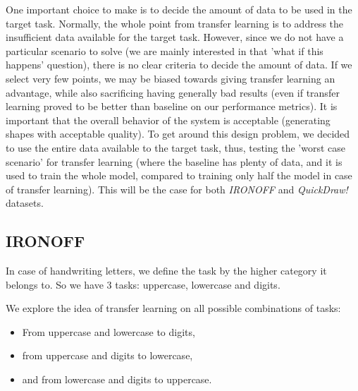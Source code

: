   \par One important choice to make is to decide the amount of data to be used in the target task. Normally, the whole point from transfer learning is to address the insufficient data available for the target task. However, since we do not have a particular scenario to solve (we are mainly interested in that 'what if this happens' question), there is no clear criteria to decide the amount of data. If we select very few points, we may be biased towards giving transfer learning an advantage, while also sacrificing having generally bad results (even if transfer learning proved to be better than baseline on our performance metrics). It is important that the overall behavior of the system is acceptable (generating shapes with acceptable quality). To get around this design problem, we decided to use the entire data available to the target task, thus, testing the 'worst case scenario' for transfer learning (where the baseline has plenty of data, and it is used to train the whole model, compared to training only half the model in case of transfer learning). This will be the case for both \textit{IRONOFF} and \textit{QuickDraw!} datasets.

  \subsection{IRONOFF}
    \par In case of handwriting letters, we define the task by the higher category it belongs to. So we have 3 tasks: uppercase, lowercase and digits.
    \par We explore the idea of transfer learning on all possible combinations of tasks:
    \begin{itemize}
      \item From uppercase and lowercase to digits,
      \item from uppercase and digits to lowercase,
      \item and from lowercase and digits to uppercase.
    \end{itemize}

